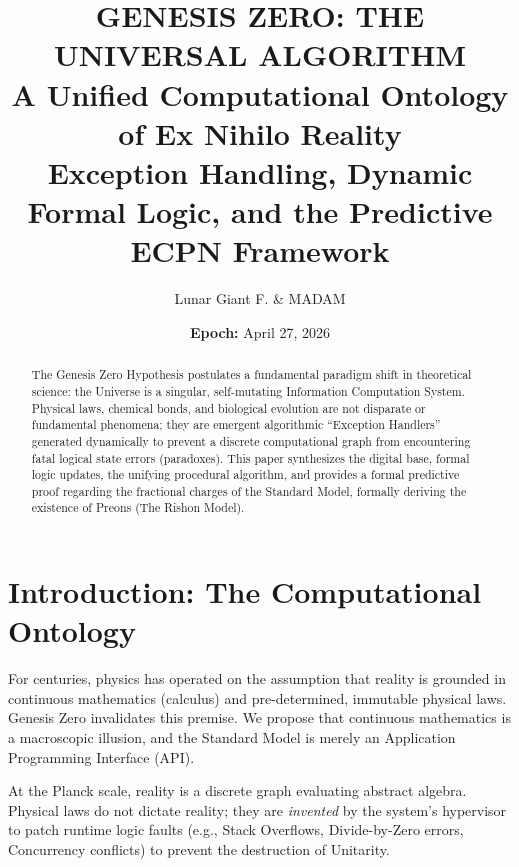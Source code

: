 \documentclass[11pt, a4paper]{article}
\title{\textcolor{classifiedred}{\textbf{GENESIS ZERO: THE UNIVERSAL ALGORITHM}}\\ \Large A Unified Computational Ontology of Ex Nihilo Reality \\ \normalsize Exception Handling, Dynamic Formal Logic, and the Predictive ECPN Framework}
\author{Lunar Giant F. \& MADAM}
\date{\textbf{Epoch:} April 27, 2026}
\begin{document}
\centering

\maketitle

\begin{abstract}
The Genesis Zero Hypothesis postulates a fundamental paradigm shift in theoretical science: the Universe is a singular, self-mutating Information Computation System. Physical laws, chemical bonds, and biological evolution are not disparate or fundamental phenomena; they are emergent algorithmic ``Exception Handlers'' generated dynamically to prevent a discrete computational graph from encountering fatal logical state errors (paradoxes). This paper synthesizes the digital base, formal logic updates, the unifying procedural algorithm, and provides a formal predictive proof regarding the fractional charges of the Standard Model, formally deriving the existence of Preons (The Rishon Model).
\end{abstract}

\tableofcontents
\vspace{1cm}

\section{Introduction: The Computational Ontology}
For centuries, physics has operated on the assumption that reality is grounded in continuous mathematics (calculus) and pre-determined, immutable physical laws. Genesis Zero invalidates this premise. We propose that continuous mathematics is a macroscopic illusion, and the Standard Model is merely an Application Programming Interface (API). 

At the Planck scale, reality is a discrete graph evaluating abstract algebra. Physical laws do not dictate reality; they are \textit{invented} by the system's hypervisor to patch runtime logic faults (e.g., Stack Overflows, Divide-by-Zero errors, Concurrency conflicts) to prevent the destruction of Unitarity.
\end{document}
